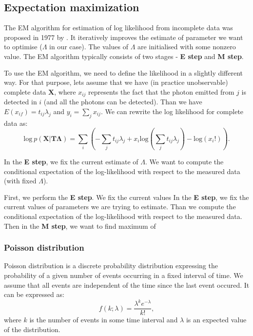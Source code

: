 \subsection{Expectation maximization}
The EM algorithm for estimation of log likelihood from incomplete data was proposed in 1977 by \cite{EM}.
It iteratively improves the estimate of parameter we want to optimise ($\Lambda$ in our case).
The values of $\Lambda$ are initialised with some nonzero value.
The EM algorithm typically consists of two stages - \textbf{E step} and \textbf{M step}.

To use the EM algorithm, we need to define the likelihood in a slightly different way.
For that purpose, lets assume that we have (in practice unobservable) complete data $\mathbf{X}$, where $x_{ij}$ represents the fact that the photon emitted from $j$ is detected in $i$ (and all the photons can be detected).
Than we have $E(x_{if}) = t_{ij}\lambda_{j}$ and $y_{i} = \sum_{j}x_{ij}$. 
We can rewrite the log likelihood for complete data as:
\begin{equation}  
  \mathrm{log}\ p(\mathbf{X} | \mathbf{T\Lambda} ) = \sum_{i}\left ( -\sum_{j} t_{ij}\lambda_{j} + x_{i} \mathrm{log}(\sum_{j} t_{ij}\lambda_{j})  - \mathrm{log}(x_{i}!) \right ).
  \label{eq:likelihood2}
\end{equation}

In the \textbf{E step}, we fix the current estimate of $\Lambda$. 
We want to compute the conditional expectation of the log-likelihood with respect to the measured data (with fixed $\Lambda$).



First, we perform the \textbf{E step}.
We fix the current values 
In the \textbf{E step}, we fix the current values of parameters we are trying to estimate.
Than we compute the conditional expectation of the log-likelihood with respect to the measured data.
Then in the \textbf{M step}, we want to find maximum of 


\subsubsection{Poisson distribution}
Poisson distribution is a discrete probability distribution expressing the probability of a given number of events occurring in a fixed interval of time.
We assume that all events are independent of the time since the last event occured.
It can be expressed as:
\begin{equation}
  f(k;\lambda )={\frac {\lambda ^{k}e^{-\lambda }}{k!}},
\end{equation}
where $k$ is the number of events in some time interval and $\lambda$ is an expected value of the distribution.




